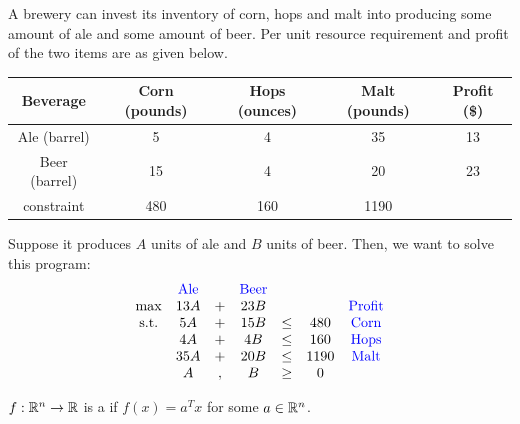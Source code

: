\begin{example}[Brewery]
    A brewery can invest its inventory of corn, hops and malt into producing some amount of ale and some amount of beer.  Per unit resource requirement and profit of the two items are as given below.

    \begin{table}[ht!]
        \centering
        \begin{tabular}{|c|c|c|c|c|}
            \hline
            Beverage      & Corn (pounds) & Hops (ounces) & Malt (pounds) & Profit (\$) \\ \hline
            Ale (barrel)  & 5             & 4             & 35            & 13          \\ \hline
            Beer (barrel) & 15            & 4             & 20            & 23          \\ \hline
            constraint    & 480           & 160           & 1190          &             \\ \hline
        \end{tabular}
    \end{table}

    Suppose it produces $A$ units of ale and $B$ units of beer. Then, we want to solve this program:
    \[
        \begin{matrix}
                        & \color{blue} \text{Ale} &   & \color{blue} \text{Beer} &      &      &                            \\
            \max        & 13A                     & + & 23B                      &      &      & \color{blue} \text{Profit} \\
            \text{s.t.} & 5A                      & + & 15B                      & \leq & 480  & \color{blue} \text{Corn}   \\
                        & 4A                      & + & 4B                       & \leq & 160  & \color{blue} \text{Hops}   \\
                        & 35A                     & + & 20B                      & \leq & 1190 & \color{blue} \text{Malt}   \\
                        & A                       & , & B                        & \geq & 0    &                            \\
        \end{matrix}
    \]
\end{example}

\begin{definition}
    $f: \mathbb{R}^n \to \mathbb{R}$ is a  if $f(x) = a^Tx$ for some $a \in \mathbb{R}^n$. 
\end{definition}

